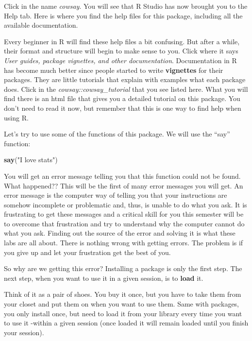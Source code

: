 \documentclass[
]{book}
\newenvironment{Shaded}{\begin{snugshade}}{\end{snugshade}}
\newcommand{\FunctionTok}[1]{\textcolor[rgb]{0.13,0.29,0.53}{\textbf{#1}}}
\newcommand{\NormalTok}[1]{#1}
\newcommand{\StringTok}[1]{\textcolor[rgb]{0.31,0.60,0.02}{#1}}
\begin{document}
Click in the name \emph{cowsay}. You will see that R Studio has now brought you to the Help tab. Here is where you find the help files for this package, including all the available documentation.

Every beginner in R will find these help files a bit confusing. But after a while, their format and structure will begin to make sense to you. Click where it says \emph{User guides, package vignettes, and other documentation}. Documentation in R has become much better since people started to write \textbf{vignettes} for their packages. They are little tutorials that explain with examples what each package does. Click in the \emph{cowsay::cowsay\_tutorial} that you see listed here. What you will find there is an html file that gives you a detailed tutorial on this package. You don't need to read it now, but remember that this is one way to find help when using R.

Let's try to use some of the functions of this package. We will use the ``say'' function:

\begin{Shaded}
\begin{Highlighting}[]
\FunctionTok{say}\NormalTok{(}\StringTok{"I love stats"}\NormalTok{)}
\end{Highlighting}
\end{Shaded}

You will get an error message telling you that this function could not be found. What happened?? This will be the first of many error messages you will get. An error message is the computer way of telling you that your instructions are somehow incomplete or problematic and, thus, is unable to do what you ask. It is frustrating to get these messages and a critical skill for you this semester will be to overcome that frustration and try to understand why the computer cannot do what you ask. Finding out the source of the error and solving it is what these labs are all about. There is nothing wrong with getting errors. The problem is if you give up and let your frustration get the best of you.

So why are we getting this error? Installing a package is only the first step. The next step, when you want to use it in a given session, is to \textbf{load} it.

Think of it as a pair of shoes. You buy it once, but you have to take them from your closet and put them on when you want to use them. Same with packages, you only install once, but need to load it from your library every time you want to use it -within a given session (once loaded it will remain loaded until you finish your session).
\end{document}
